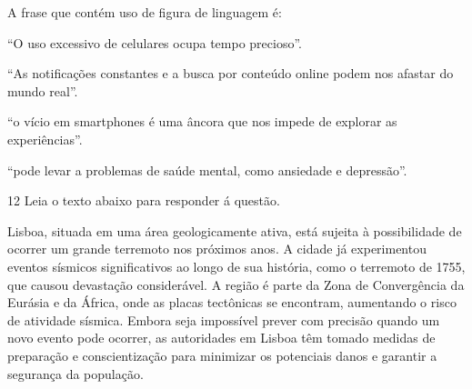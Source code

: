 
A frase que contém uso de figura de linguagem é:

\begin{escolha}
    
    \item ``O uso excessivo de celulares ocupa tempo precioso''.
    
    \item ``As notificações constantes e a busca por conteúdo online podem nos afastar do mundo real''.
    
    \item ``o vício em smartphones é uma âncora que nos impede de explorar as experiências''.
    
    \item ``pode levar a problemas de saúde mental, como ansiedade e depressão''.

\end{escolha}

\num{12} Leia o texto abaixo para responder á questão.

\begin{myquote}

Lisboa, situada em uma área geologicamente ativa, está sujeita à possibilidade
de ocorrer um grande terremoto nos próximos anos. A cidade já experimentou
eventos sísmicos significativos ao longo de sua história, como o terremoto de
1755, que causou devastação considerável. A região é parte da Zona de
Convergência da Eurásia e da África, onde as placas tectônicas se encontram,
aumentando o risco de atividade sísmica. Embora seja impossível prever com
precisão quando um novo evento pode ocorrer, as autoridades em Lisboa têm
tomado medidas de preparação e conscientização para minimizar os potenciais
danos e garantir a segurança da população.


\end{myquote}


